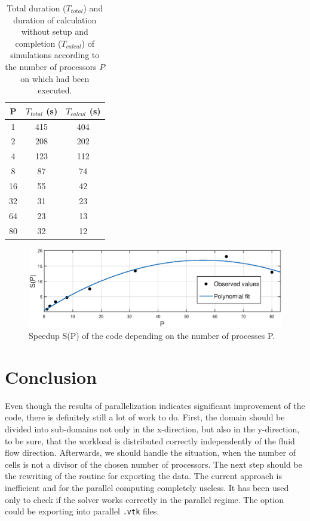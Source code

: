 \documentclass[a4paper, 10pt]{article}
\begin{document}
\begingroup
\renewcommand*{\arraystretch}{1.5}
\begin{table}[h!]
	\centering
	\begin{tabular}{  c | c | c }
		P & $ T_{total} $ (s) & $ T_{calcul} $ (s) \\
		\hline \hline
		1 & 415 & 404 \\ \hline
		2 & 208 & 202 \\ \hline
		4 & 123 & 112 \\ \hline
		8 & 87 & 74 \\ \hline
		16 & 55 & 42 \\ \hline
		32 & 31 & 23 \\ \hline
		64 & 23 & 13 \\ \hline
		80 & 32 & 12 \\
	\end{tabular}
	\caption{Total duration ($ T_{total} $) and duration of calculation without setup and completion ($ T_{calcul} $) of simulations according to the number of processors $ P $ on which had been executed.}
	\label{2.3.16}
\end{table}
\endgroup

\begin{figure}[h!]
	\centering
	\includegraphics[width=0.9\linewidth]{img/2.eps}
	\caption{Speedup S(P) of the code depending on the number of processes P.}
\end{figure}


\section{Conclusion}

Even though the results of parallelization indicates significant improvement of the code, there is definitely still a lot of work to do. First, the domain should be divided into sub-domains not only in the x-direction, but also in the y-direction, to be sure, that the workload is distributed correctly independently of the fluid flow direction. Afterwards, we should handle the situation, when the number of cells is not a divisor of the chosen number of processors. The next step should be the rewriting of the routine for exporting the data. The current approach is inefficient and for the parallel computing completely useless. It has been used only to check if the solver works correctly in the parallel regime. The option could be exporting into parallel \texttt{.vtk} files.\\
\end{document}

